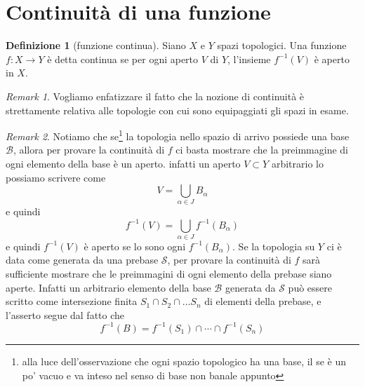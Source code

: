 \documentclass[10pt,a4paper]{article}
\theoremstyle{definition}
\newtheorem{defi}{Definizione}
\theoremstyle{plain}
\theoremstyle{remark}
\newtheorem{rem}{Remark}
\theoremstyle{remark}
\newcommand{\B}{\mathcal{B}}
\newcommand{\Ss}{\mathcal{S}}
\begin{document}
\section{Continuità di una funzione}
%
%
\begin{defi}[funzione continua] Siano $X$ e $Y$ spazi topologici. Una funzione $f : X \to Y$ è detta continua se per ogni aperto $V$ di $Y$, l'insieme $f^{-1}(V)$ è aperto in $X$. 
\end{defi}

\begin{rem} Vogliamo enfatizzare il fatto che la nozione di continuità è strettamente relativa alle topologie con cui sono equipaggiati gli spazi in esame. 
\end{rem}

\begin{rem} Notiamo che se\footnote{alla luce dell'osservazione che ogni spazio topologico ha una base, il se è un po' vacuo e va inteso nel senso di base non banale appunto} la topologia nello spazio di arrivo possiede una base $\B$, allora per provare la continuità di $f$ ci basta mostrare che la preimmagine di ogni elemento della base è un aperto. infatti un aperto $V \subset Y$ arbitrario lo possiamo scrivere come \[ V = \bigcup_{\alpha \in J} B_{\alpha} \] e quindi \[ f^{-1}(V) = \bigcup_{\alpha \in J} f^{-1}(B_{\alpha}) \]
e quindi $f^{-1}(V)$ è aperto se lo sono ogni $f^{-1}(B_{\alpha})$. Se la topologia su $Y$ ci è data come generata da una prebase $\Ss$, per provare la continuità di $f$ sarà sufficiente mostrare che le preimmagini di ogni elemento della prebase siano aperte. Infatti un arbitrario elemento della base $\B$ generata da $\Ss$ può essere scritto come intersezione finita $S_1 \cap S_2 \cap \dots S_n$ di elementi della prebase, e l'asserto segue dal fatto che \[ f^{-1}(B) = f^{-1}(S_1) \cap \cdots \cap f^{-1}(S_n) \] 
\end{rem}
\end{document}
